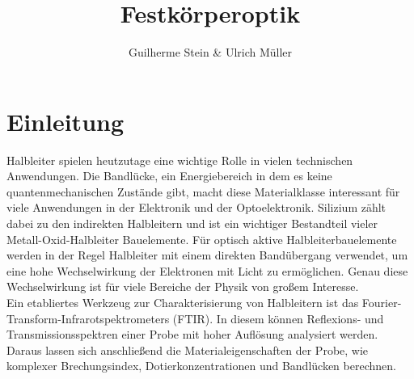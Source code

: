 \documentclass[paper=a4,fontsize=10pt,DIV=18,twocolumn,parskip=half]{scrartcl}
\numberwithin{equation}{section}    %
\begin{document}
\title{Festkörperoptik}                  
\author{Guilherme Stein \& Ulrich Müller}         
\date{}                             %



\section{Einleitung}

Halbleiter spielen heutzutage eine wichtige Rolle in vielen technischen 
Anwendungen. Die Bandlücke, ein Energiebereich in dem es keine 
quantenmechanischen Zustände gibt, macht diese Materialklasse interessant für 
viele Anwendungen in der Elektronik und der Optoelektronik. Silizium zählt dabei 
zu den indirekten Halbleitern und ist ein wichtiger Bestandteil vieler 
Metall-Oxid-Halbleiter Bauelemente. Für optisch aktive Halbleiterbauelemente 
werden in der Regel Halbleiter mit einem direkten Bandübergang verwendet, um 
eine hohe Wechselwirkung der Elektronen mit Licht zu ermöglichen. Genau diese 
Wechselwirkung ist für viele Bereiche der Physik von großem Interesse. \\
Ein etabliertes Werkzeug zur Charakterisierung von Halbleitern ist das 
Fourier-Transform-Infrarotspektrometers (FTIR). In diesem können Reflexions- und 
Transmissionsspektren einer Probe mit hoher Auflösung analysiert werden. Daraus 
lassen sich anschließend die Materialeigenschaften der Probe, wie komplexer 
Brechungsindex, Dotierkonzentrationen und Bandlücken berechnen. 
\end{document}
